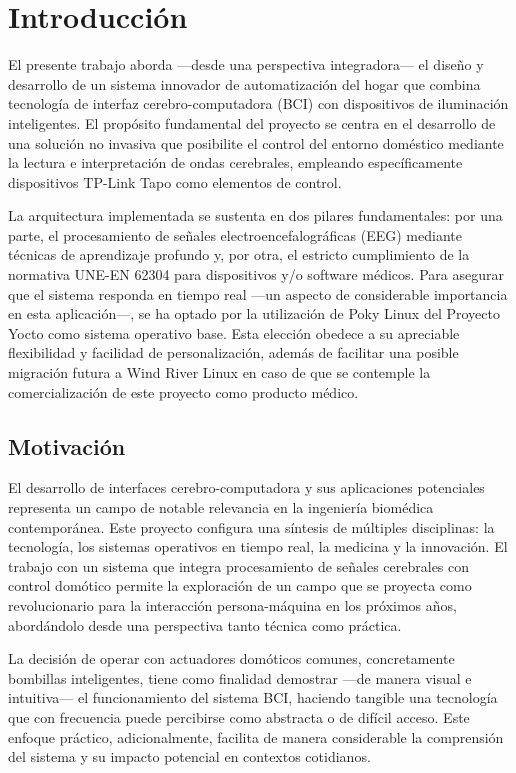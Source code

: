 \chapter{Introducción}

El presente trabajo aborda —desde una perspectiva integradora— el diseño y desarrollo de un sistema innovador de automatización del hogar que combina tecnología de interfaz cerebro-computadora (BCI) con dispositivos de iluminación inteligentes. El propósito fundamental del proyecto se centra en el desarrollo de una solución no invasiva que posibilite el control del entorno doméstico mediante la lectura e interpretación de ondas cerebrales, empleando específicamente dispositivos TP-Link Tapo como elementos de control.

La arquitectura implementada se sustenta en dos pilares fundamentales: por una parte, el procesamiento de señales electroencefalográficas (EEG) mediante técnicas de aprendizaje profundo y, por otra, el estricto cumplimiento de la normativa UNE-EN 62304 para dispositivos y/o software médicos. Para asegurar que el sistema responda en tiempo real —un aspecto de considerable importancia en esta aplicación—, se ha optado por la utilización de Poky Linux del Proyecto Yocto como sistema operativo base. Esta elección obedece a su apreciable flexibilidad y facilidad de personalización, además de facilitar una posible migración futura a Wind River Linux en caso de que se contemple la comercialización de este proyecto como producto médico.

\section{Motivación}
El desarrollo de interfaces cerebro-computadora y sus aplicaciones potenciales representa un campo de notable relevancia en la ingeniería biomédica contemporánea. Este proyecto configura una síntesis de múltiples disciplinas: la tecnología, los sistemas operativos en tiempo real, la medicina y la innovación. El trabajo con un sistema que integra procesamiento de señales cerebrales con control domótico permite la exploración de un campo que se proyecta como revolucionario para la interacción persona-máquina en los próximos años, abordándolo desde una perspectiva tanto técnica como práctica.

La decisión de operar con actuadores domóticos comunes, concretamente bombillas inteligentes, tiene como finalidad demostrar —de manera visual e intuitiva— el funcionamiento del sistema BCI, haciendo tangible una tecnología que con frecuencia puede percibirse como abstracta o de difícil acceso. Este enfoque práctico, adicionalmente, facilita de manera considerable la comprensión del sistema y su impacto potencial en contextos cotidianos.

